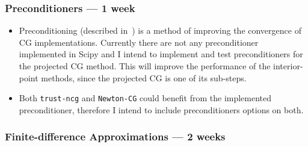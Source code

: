 \documentclass[11pt]{article}
\begin{document}
\subsubsection*{Preconditioners --- 1 week}
\begin{itemize}
\item
  Preconditioning (described in~\cite[pp. 118-120]{nocedal2006numerical})
  is a method of improving the convergence of CG implementations.
  Currently there are not any preconditioner implemented in Scipy and
  I intend to implement and test preconditioners for the projected CG method.
  This will improve the performance of the interior-point methods,
  since the projected CG is one of its sub-steps.
\item
  Both \texttt{trust-ncg} and \texttt{Newton-CG} could benefit from the
  implemented preconditioner, therefore I intend to include preconditioners options on both.
\end{itemize}

\subsubsection*{Finite-difference Approximations --- 2 weeks}
\end{document}
